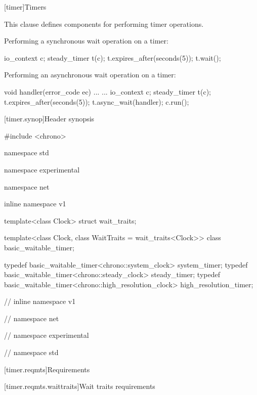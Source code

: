 
[timer]{Timers}

\pnum
This clause defines components for performing timer operations.

\pnum
\enterexample Performing a synchronous wait operation on a timer: 
\begin{codeblock}
io_context c;
steady_timer t(c);
t.expires_after(seconds(5));
t.wait();
\end{codeblock}
 \exitexample

\pnum
\enterexample Performing an asynchronous wait operation on a timer: 
\begin{codeblock}
void handler(error_code ec) { ... }
...
io_context c;
steady_timer t(c);
t.expires_after(seconds(5));
t.async_wait(handler);
c.run();
\end{codeblock}
 \exitexample


%
[timer.synop]{Header  synopsis}

\begin{codeblock}
#include <chrono>

namespace std {
namespace experimental {
namespace net {
inline namespace v1 {

  template<class Clock> struct wait_traits;

  template<class Clock, class WaitTraits = wait_traits<Clock>>
    class basic_waitable_timer;

  typedef basic_waitable_timer<chrono::system_clock> system_timer;
  typedef basic_waitable_timer<chrono::steady_clock> steady_timer;
  typedef basic_waitable_timer<chrono::high_resolution_clock> high_resolution_timer;

} // inline namespace v1
} // namespace net
} // namespace experimental
} // namespace std
\end{codeblock}



[timer.reqmts]{Requirements}


[timer.reqmts.waittraits]{Wait traits requirements}

